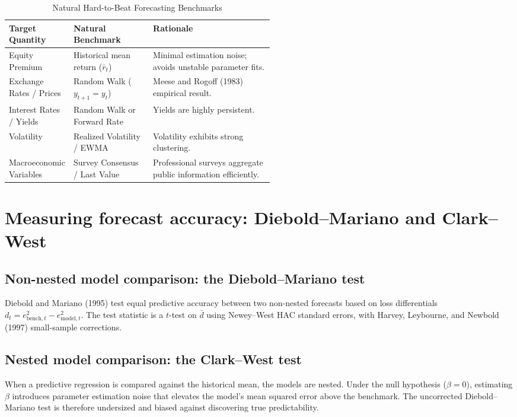 \begin{table}[htbp]
\centering
\small
\caption{Natural Hard-to-Beat Forecasting Benchmarks}
\label{tab:08-benchmarks}
\begin{tabularx}{0.95\linewidth}{@{}>{\raggedright\arraybackslash}p{0.22\linewidth}>{\raggedright\arraybackslash}p{0.30\linewidth}>{\raggedright\arraybackslash}X@{}}
\toprule
Target Quantity & Natural Benchmark & Rationale \\
\midrule
Equity Premium & Historical mean return ($\bar{r}_t$) & Minimal estimation noise; avoids unstable parameter fits. \\
Exchange Rates / Prices & Random Walk ($y_{t+1} = y_t$) & Meese and Rogoff (1983) empirical result. \\
Interest Rates / Yields & Random Walk or Forward Rate & Yields are highly persistent. \\
Volatility & Realized Volatility / EWMA & Volatility exhibits strong clustering. \\
Macroeconomic Variables & Survey Consensus / Last Value & Professional surveys aggregate public information efficiently. \\
\bottomrule
\end{tabularx}
\end{table}

\section{Measuring forecast accuracy: Diebold--Mariano and Clark--West}
\label{sec:08-accuracy}

\subsection{Non-nested model comparison: the Diebold--Mariano test}
Diebold and Mariano (1995) test equal predictive accuracy between two non-nested forecasts based on loss differentials $d_t = e^2_{\text{bench},t} - e^2_{\text{model},t}$. The test statistic is a $t$-test on $\bar{d}$ using Newey--West HAC standard errors, with Harvey, Leybourne, and Newbold (1997) small-sample corrections.

\subsection{Nested model comparison: the Clark--West test}
When a predictive regression is compared against the historical mean, the models are nested. Under the null hypothesis ($\beta=0$), estimating $\beta$ introduces parameter estimation noise that elevates the model's mean squared error above the benchmark. The uncorrected Diebold--Mariano test is therefore undersized and biased against discovering true predictability.

